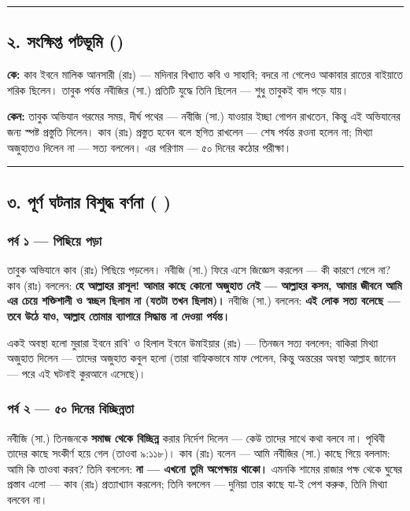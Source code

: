 \medskip\hrule\medskip

\subsection*{২. সংক্ষিপ্ত পটভূমি ()}

\textbf{কে:} কাব ইবনে মালিক আনসারী (রাঃ) — মদিনার বিখ্যাত কবি ও সাহাবি; বদরে না গেলেও আকাবার রাতের বাইয়াতে শরিক ছিলেন। তাবুক পর্যন্ত নবীজির (সা.) প্রতিটি যুদ্ধে তিনি ছিলেন — শুধু তাবুকই বাদ পড়ে যায়।

\textbf{কেন:} তাবুক অভিযান গরমের সময়, দীর্ঘ পথের — নবীজি (সা.) যাওয়ার ইচ্ছা গোপন রাখতেন, কিন্তু এই অভিযানের জন্য স্পষ্ট প্রস্তুতি নিলেন। কাব (রাঃ) প্রস্তুত হবেন বলে স্থগিত রাখলেন — শেষ পর্যন্ত রওনা হলেন না; মিথ্যা অজুহাতও দিলেন না — সত্য বললেন। এর পরিণাম — ৫০ দিনের কঠোর পরীক্ষা।

\medskip\hrule\medskip

\subsection*{৩. পূর্ণ ঘটনার বিশুদ্ধ বর্ণনা (  )}

\subsubsection*{পর্ব ১ — পিছিয়ে পড়া}

তাবুক অভিযানে কাব (রাঃ) পিছিয়ে পড়লেন। নবীজি (সা.) ফিরে এসে জিজ্ঞেস করলেন — কী কারণে গেলে না? কাব (রাঃ) বললেন: \textbf{হে আল্লাহর রাসূল! আমার কাছে কোনো অজুহাত নেই — আল্লাহর কসম, আমার জীবনে আমি এর চেয়ে শক্তিশালী ও স্বচ্ছল ছিলাম না (যতটা তখন ছিলাম)।} নবীজি (সা.) বললেন: \textbf{এই লোক সত্য বলেছে — তবে উঠে যাও, আল্লাহ তোমার ব্যাপারে সিদ্ধান্ত না দেওয়া পর্যন্ত।}

একই অবস্থা হলো মুরারা ইবনে রাবি' ও হিলাল ইবনে উমাইয়ার (রাঃ) — তিনজন সত্য বললেন; বাকিরা মিথ্যা অজুহাত দিলেন — তাদের অজুহাত কবুল হলো (তারা বাহ্যিকভাবে মাফ পেলেন, কিন্তু অন্তরের অবস্থা আল্লাহ জানেন — পরে এই ঘটনাই কুরআনে এসেছে)।

\subsubsection*{পর্ব ২ — ৫০ দিনের বিচ্ছিন্নতা}

নবীজি (সা.) তিনজনকে \textbf{সমাজ থেকে বিচ্ছিন্ন} করার নির্দেশ দিলেন — কেউ তাদের সাথে কথা বলবে না। পৃথিবী তাদের কাছে সংকীর্ণ হয়ে গেল (তাওবা ৯:১১৮)। কাব (রাঃ) বলেন — আমি নবীজির (সা.) কাছে গিয়ে বললাম: আমি কি তাওবা করব? তিনি বললেন: \textbf{না — এখনো তুমি অপেক্ষায় থাকো।} এমনকি শামের রাজার পক্ষ থেকে ঘুষের প্রস্তাব এলো — কাব (রাঃ) প্রত্যাখ্যান করলেন; তিনি বললেন — দুনিয়া তার কাছে যা-ই পেশ করুক, তিনি মিথ্যা বলবেন না।

